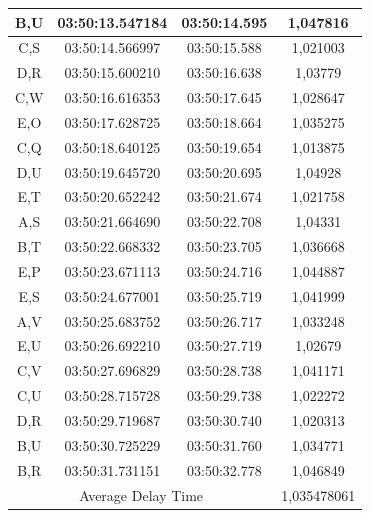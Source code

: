 \begin{table}[htpb]
\begin{tabular}{|ccc|c|}
  \multicolumn{1}{|c|}{B,U}  & \multicolumn{1}{c|}{03:50:13.547184} & 03:50:14.595       & 1,047816    \\ \hline
  \multicolumn{1}{|c|}{C,S}  & \multicolumn{1}{c|}{03:50:14.566997} & 03:50:15.588       & 1,021003    \\ \hline
  \multicolumn{1}{|c|}{D,R}  & \multicolumn{1}{c|}{03:50:15.600210} & 03:50:16.638       & 1,03779     \\ \hline
  \multicolumn{1}{|c|}{C,W}  & \multicolumn{1}{c|}{03:50:16.616353} & 03:50:17.645       & 1,028647    \\ \hline
  \multicolumn{1}{|c|}{E,O}  & \multicolumn{1}{c|}{03:50:17.628725} & 03:50:18.664       & 1,035275    \\ \hline
  \multicolumn{1}{|c|}{C,Q}  & \multicolumn{1}{c|}{03:50:18.640125} & 03:50:19.654       & 1,013875    \\ \hline
  \multicolumn{1}{|c|}{D,U}  & \multicolumn{1}{c|}{03:50:19.645720} & 03:50:20.695       & 1,04928     \\ \hline
  \multicolumn{1}{|c|}{E,T}  & \multicolumn{1}{c|}{03:50:20.652242} & 03:50:21.674       & 1,021758    \\ \hline
  \multicolumn{1}{|c|}{A,S}  & \multicolumn{1}{c|}{03:50:21.664690} & 03:50:22.708       & 1,04331     \\ \hline
  \multicolumn{1}{|c|}{B,T}  & \multicolumn{1}{c|}{03:50:22.668332} & 03:50:23.705       & 1,036668    \\ \hline
  \multicolumn{1}{|c|}{E,P}  & \multicolumn{1}{c|}{03:50:23.671113} & 03:50:24.716       & 1,044887    \\ \hline
  \multicolumn{1}{|c|}{E,S}  & \multicolumn{1}{c|}{03:50:24.677001} & 03:50:25.719       & 1,041999    \\ \hline
  \multicolumn{1}{|c|}{A,V}  & \multicolumn{1}{c|}{03:50:25.683752} & 03:50:26.717       & 1,033248    \\ \hline
  \multicolumn{1}{|c|}{E,U}  & \multicolumn{1}{c|}{03:50:26.692210} & 03:50:27.719       & 1,02679     \\ \hline
  \multicolumn{1}{|c|}{C,V}  & \multicolumn{1}{c|}{03:50:27.696829} & 03:50:28.738       & 1,041171    \\ \hline
  \multicolumn{1}{|c|}{C,U}  & \multicolumn{1}{c|}{03:50:28.715728} & 03:50:29.738       & 1,022272    \\ \hline
  \multicolumn{1}{|c|}{D,R}  & \multicolumn{1}{c|}{03:50:29.719687} & 03:50:30.740       & 1,020313    \\ \hline
  \multicolumn{1}{|c|}{B,U}  & \multicolumn{1}{c|}{03:50:30.725229} & 03:50:31.760       & 1,034771    \\ \hline
  \multicolumn{1}{|c|}{B,R}  & \multicolumn{1}{c|}{03:50:31.731151} & 03:50:32.778       & 1,046849    \\ \hline
  \multicolumn{3}{|c|}{Average Delay Time}                                               & 1,035478061 \\ \hline
  \end{tabular}
\end{table}

